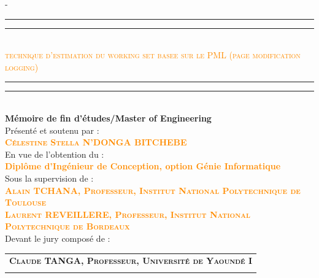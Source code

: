 \begin{titlingpage}
\begin{SingleSpace}
\begin{adjustwidth*}{\unitlength}{-\unitlength}
\vspace{0.3cm}
\begin{center}
\textcolor{darkorange}{\rule[0.5ex]{\linewidth}{2pt}\vspace*{-\baselineskip}\vspace*{2.9pt}}
\textcolor{darkorange}{\rule[0.5ex]{\linewidth}{1pt}}\\[\baselineskip]
{\Large {\textcolor{darkorange}{\textsc{ technique d'estimation du working set basee sur le PML (page modification logging) }}
} }\\[2mm]
\textcolor{darkorange}{\rule[0.5ex]{\linewidth}{1pt}\vspace*{-\baselineskip}\vspace{3.2pt}}
\textcolor{darkorange}{\rule[0.5ex]{\linewidth}{2pt}}\\[3mm]
{\Large \textbf{Mémoire de fin d’études/Master of Engineering}}\\
\vspace{4mm}
{\Large Présenté et soutenu par :} \\
\vspace{4mm}
{\large \textsc{\textbf{\textcolor{darkorange}{Célestine Stella N'DONGA BITCHEBE}}}}\\
\vspace{6mm}
{\Large En vue de l'obtention du :} \\
\vspace{4mm}
{\large \textbf{\textcolor{darkorange}{Diplôme d’Ingénieur de Conception, option Génie Informatique}}}\\
\vspace{4mm}
{\Large Sous la supervision de :}\\
\vspace{4mm}
{\normalsize \textsc{\textbf{\textcolor{darkorange}{Alain TCHANA, Professeur, Institut National Polytechnique de Toulouse}}}}\\
\vspace{4.5mm}
{\normalsize \textsc{\textbf{\textcolor{darkorange}{Laurent REVEILLERE, Professeur, Institut National Polytechnique de Bordeaux}}}}\\
\vspace{4.5mm}
{\Large Devant le jury composé de :} \\
\vspace{4.5mm}
\begin{tabular}{>{\centering\arraybackslash}p{16cm}}
{\Large Président:} \textbf{{\large \textsc{Claude TANGA, Professeur, Université de Yaoundé I}}} \\ \\


\end{tabular}
\end{center}
\end{adjustwidth*}
\end{SingleSpace}
\end{titlingpage}

